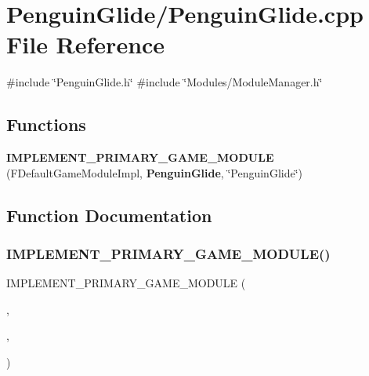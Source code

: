 \section{Penguin\+Glide/\+Penguin\+Glide.cpp File Reference}
\label{_penguin_glide_8cpp}
{\ttfamily \#include \char`\"{}Penguin\+Glide.\+h\char`\"{}}\newline
{\ttfamily \#include \char`\"{}Modules/\+Module\+Manager.\+h\char`\"{}}\newline
\subsection*{Functions}
\begin{DoxyCompactItemize}
\item 
\textbf{ I\+M\+P\+L\+E\+M\+E\+N\+T\+\_\+\+P\+R\+I\+M\+A\+R\+Y\+\_\+\+G\+A\+M\+E\+\_\+\+M\+O\+D\+U\+LE} (F\+Default\+Game\+Module\+Impl, \textbf{ Penguin\+Glide}, \char`\"{}Penguin\+Glide\char`\"{})
\end{DoxyCompactItemize}


\subsection{Function Documentation}
\mbox{\label{_penguin_glide_8cpp_a1933ee7ecf832a79965c3e9aeb7bd1e2}} 
\subsubsection{IMPLEMENT\_PRIMARY\_GAME\_MODULE()}
{\footnotesize\ttfamily I\+M\+P\+L\+E\+M\+E\+N\+T\+\_\+\+P\+R\+I\+M\+A\+R\+Y\+\_\+\+G\+A\+M\+E\+\_\+\+M\+O\+D\+U\+LE (\begin{DoxyParamCaption}\item[{F\+Default\+Game\+Module\+Impl}]{,  }\item[{\textbf{ Penguin\+Glide}}]{,  }\item[{\char`\"{}Penguin\+Glide\char`\"{}}]{ }\end{DoxyParamCaption})}

